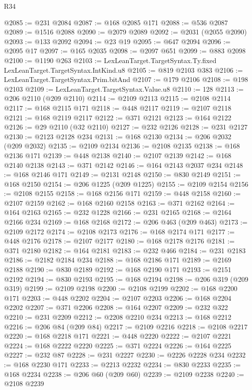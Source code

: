 \begin{lexlean}{R34}
\begin{coremodule}
@2085 := @231 @2084
@2087 := @168 @2085 @171
@2088 := @536 @2087
@2089 := @1516 @2088
@2090 := @2079 @2089
@2092 := @2031 (@2055 @2090)
@2093 := @133 @2092
@2094 := @23 @19
@2095 := @647 @2094
@2096 := @2095 @17
@2097 := @165 @2035
@2098 := @2097 @651
@2099 := @883 @2098
@2100 := @1190 @263
@2103 := LexLeanTarget.TargetSyntax.Ty.fixed LexLeanTarget.TargetSyntax.IntKind.u8
@2105 := @819 @2103 @383
@2106 := LexLeanTarget.TargetSyntax.Prim.bitAnd
@2107 := @179 @2106
@2108 := @198 @2103
@2109 := LexLeanTarget.TargetSyntax.Value.u8
@2110 := 128
@2113 := @206 @2110 (@209 @2110)
@2114 := @2109 @2113
@2115 := @2108 @2114
@2117 := @168 @2115 @171
@2118 := @448 @2117
@2119 := @2107 @2118
@2121 := @168 @2119 @2117
@2122 := @371 @2121
@2123 := @164 @2122
@2126 := @29 @2110 (@32 @2110)
@2127 := @232 @2126
@2128 := @231 @2127
@2130 := @2123 @2128 @234
@2131 := @168 @2130
@2134 := @206 @2032 (@209 @2032)
@2135 := @2109 @2134
@2136 := @2108 @2135
@2138 := @168 @2136 @171
@2139 := @448 @2138
@2140 := @2107 @2139
@2142 := @168 @2140 @2138
@2143 := @371 @2142
@2146 := @164 @2143 @2037 @234
@2148 := @168 @2146 @171
@2149 := @2131 @2148
@2150 := @830 @2149
@2151 := @168 @2150
@2154 := @206 @1225 (@209 @1225)
@2155 := @2109 @2154
@2156 := @2108 @2155
@2158 := @168 @2156 @171
@2159 := @448 @2158
@2160 := @2107 @2159
@2162 := @168 @2160 @2158
@2163 := @371 @2162
@2164 := @164 @2163
@2165 := @232 @1228
@2166 := @231 @2165
@2168 := @2164 @2166 @234
@2169 := @168 @2168
@2172 := @206 @463 (@209 @463)
@2173 := @2109 @2172
@2174 := @2108 @2173
@2176 := @168 @2174 @171
@2177 := @448 @2176
@2178 := @2107 @2177
@2180 := @168 @2178 @2176
@2181 := @371 @2180
@2182 := @164 @2181
@2183 := @232 @466
@2184 := @231 @2183
@2186 := @2182 @2184 @234
@2188 := @168 @2186 @171
@2189 := @2169 @2188
@2190 := @830 @2189
@2192 := @168 @2190 @171
@2193 := @2151 @2192
@2194 := @830 @2193
@2195 := @168 @2194
@2198 := @206 @319 (@209 @319)
@2199 := @2109 @2198
@2200 := @2108 @2199
@2202 := @168 @2200 @171
@2203 := @448 @2202
@2204 := @2107 @2203
@2206 := @168 @2204 @2202
@2207 := @371 @2206
@2208 := @164 @2207
@2209 := @232 @322
@2210 := @231 @2209
@2212 := @2208 @2210 @234
@2213 := @168 @2212
@2216 := @206 @84 (@209 @84)
@2217 := @2109 @2216
@2218 := @2108 @2217
@2220 := @168 @2218 @171
@2221 := @448 @2220
@2222 := @2107 @2221
@2224 := @168 @2222 @2220
@2225 := @371 @2224
@2226 := @164 @2225
@2227 := @232 @87
@2228 := @231 @2227
@2230 := @2226 @2228 @234
@2232 := @168 @2230 @171
@2233 := @2213 @2232
@2234 := @830 @2233
@2235 := @168 @2234
@2238 := @206 @60 (@209 @60)
@2239 := @2109 @2238
@2240 := @2108 @2239

\end{coremodule}
\end{lexlean}
